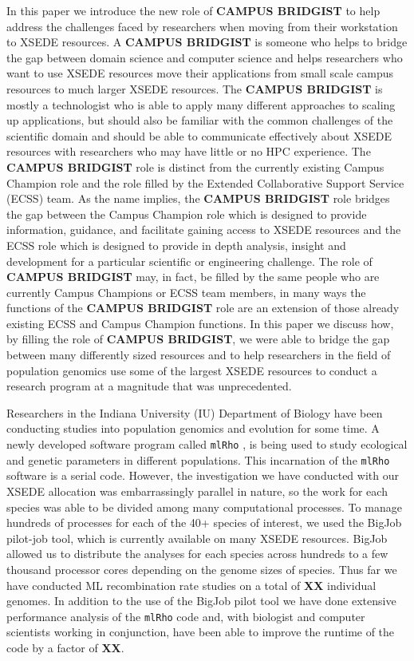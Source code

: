 \documentclass{sig-alternate}
\begin{document}
In this paper we introduce the new role of {\bf CAMPUS BRIDGIST} to help address the challenges faced by
researchers when moving from their workstation to XSEDE resources. A {\bf CAMPUS BRIDGIST} is someone who
helps to bridge the gap between domain science and computer science and helps researchers who want to use
XSEDE resources move their applications from small scale campus resources to much larger XSEDE resources. The
{\bf CAMPUS BRIDGIST} is mostly a technologist who is able to apply many different approaches to scaling up
applications, but should also be familiar with the common challenges of the scientific domain and should be
able to communicate effectively about XSEDE resources with researchers who may have little or no HPC
experience. The {\bf CAMPUS BRIDGIST} role is distinct from the currently existing Campus Champion role and
the role filled by the Extended Collaborative Support Service (ECSS) team. As the name implies, the {\bf
  CAMPUS BRIDGIST} role bridges the gap between the Campus Champion role which is designed to provide
information, guidance, and facilitate gaining access to XSEDE resources and the ECSS role which is designed to
provide in depth analysis, insight and development for a particular scientific or engineering challenge. The
role of {\bf CAMPUS BRIDGIST} may, in fact, be filled by the same people who are currently Campus Champions or
ECSS team members, in many ways the functions of the {\bf CAMPUS BRIDGIST} role are an extension of those
already existing ECSS and Campus Champion functions. In this paper we discuss how, by filling the role of
{\bf CAMPUS BRIDGIST}, we were able to bridge the gap between many differently sized resources and to help
researchers in the field of population genomics use some of the largest XSEDE resources to conduct a research
program at a magnitude that was unprecedented.

Researchers in the Indiana University (IU) Department of Biology have been conducting studies into population
genomics and evolution for some time. A newly developed software program called \texttt{mlRho} \cite{MEC:MEC4482}, is
being used to study ecological and genetic parameters in different populations. This incarnation of the
\texttt{mlRho} software is a serial code. However, the investigation we have conducted with our XSEDE allocation was
embarrassingly parallel in nature, so the work for each species was able to be divided among many
computational processes. To manage hundreds of processes for each of the 40+ species of interest, we used the
BigJob pilot-job tool, which is currently available on many XSEDE resources. BigJob allowed us to distribute
the analyses for each species across hundreds to a few thousand processor cores depending on the genome sizes
of species. Thus far we have conducted ML recombination rate studies on a total of {\bf XX} individual
genomes. In addition to the use of the BigJob pilot tool we have done extensive performance analysis of the
\texttt{mlRho} code and, with biologist and computer scientists working in conjunction, have been able to improve the
runtime of the code by a factor of {\bf XX}.
\end{document}
